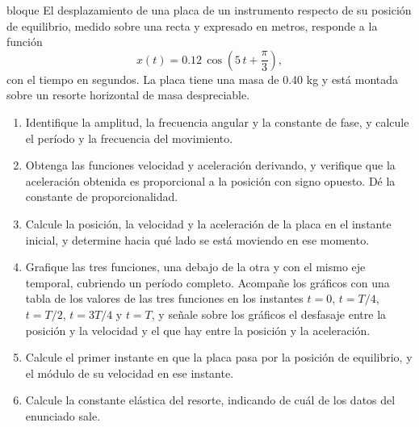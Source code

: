 \documentclass[11pt,openany]{book}
\begin{document}
\begin{ejercicio}{bloque}
El desplazamiento de una placa de un instrumento respecto de su posición de equilibrio, medido sobre una recta y expresado en metros, responde a la función
\[
x(t) = 0.12\,\cos\!\left(5\,t + \frac{\pi}{3}\right),
\]
con el tiempo en segundos. La placa tiene una masa de 0.40 kg y está montada sobre un resorte horizontal de masa despreciable.
\begin{enumerate}[label=(\alph*), leftmargin=1.7em, itemsep=1pt, topsep=3pt]
  \item Identifique la amplitud, la frecuencia angular y la constante de fase, y calcule el período y la frecuencia del movimiento.
  \item Obtenga las funciones velocidad y aceleración derivando, y verifique que la aceleración obtenida es proporcional a la posición con signo opuesto. Dé la constante de proporcionalidad.
  \item Calcule la posición, la velocidad y la aceleración de la placa en el instante inicial, y determine hacia qué lado se está moviendo en ese momento.
  \item Grafique las tres funciones, una debajo de la otra y con el mismo eje temporal, cubriendo un período completo. Acompañe los gráficos con una tabla de los valores de las tres funciones en los instantes $t = 0$, $t = T/4$, $t = T/2$, $t = 3T/4$ y $t = T$, y señale sobre los gráficos el desfasaje entre la posición y la velocidad y el que hay entre la posición y la aceleración.
  \item Calcule el primer instante en que la placa pasa por la posición de equilibrio, y el módulo de su velocidad en ese instante.
  \item Calcule la constante elástica del resorte, indicando de cuál de los datos del enunciado sale.
\end{enumerate}
\end{ejercicio}
\end{document}
